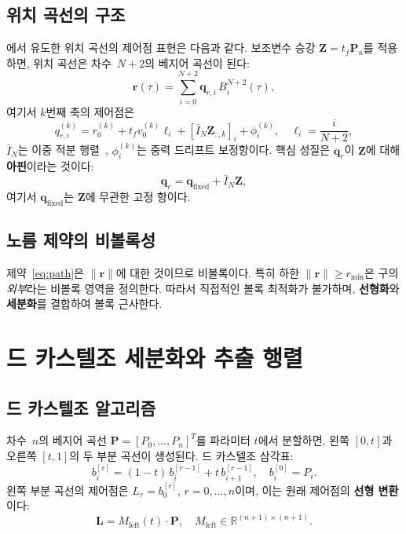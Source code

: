 \documentclass[11pt]{article}
\begin{document}
\subsection{위치 곡선의 구조}

\cite{report004,report007}에서 유도한 위치 곡선의 제어점 표현은 다음과 같다.
보조변수 승강 $\mathbf{Z} = t_f \mathbf{P}_u$를 적용하면,
위치 곡선은 차수~$N{+}2$의 베지어 곡선이 된다:
\begin{equation}\label{eq:pos_curve}
  \mathbf{r}(\tau) = \sum_{i=0}^{N+2} \mathbf{q}_{r,i}\, B_i^{N+2}(\tau),
\end{equation}
여기서 $k$번째 축의 제어점은
\begin{equation}\label{eq:qr}
  q_{r,i}^{(k)} = r_0^{(k)} + t_f v_0^{(k)} \ell_i
    + [\bar{I}_N \mathbf{Z}_{:,k}]_i
    + \phi_i^{(k)},
  \quad \ell_i = \frac{i}{N{+}2},
\end{equation}
$\bar{I}_N$는 이중 적분 행렬~\cite{report004},
$\phi_i^{(k)}$는 중력 드리프트 보정항이다.
핵심 성질은 $\mathbf{q}_r$이 $\mathbf{Z}$에 대해 \textbf{아핀}이라는 것이다:
\begin{equation}\label{eq:affine}
  \mathbf{q}_r = \mathbf{q}_{\mathrm{fixed}} + \bar{I}_N \mathbf{Z},
\end{equation}
여기서 $\mathbf{q}_{\mathrm{fixed}}$는 $\mathbf{Z}$에 무관한 고정 항이다.

\subsection{노름 제약의 비볼록성}

제약~\eqref{eq:path}은 $\|\mathbf{r}\|$에 대한 것이므로 비볼록이다.
특히 하한 $\|\mathbf{r}\| \ge r_{\min}$은
구의 \emph{외부}라는 비볼록 영역을 정의한다.
따라서 직접적인 볼록 최적화가 불가하며,
\textbf{선형화}와 \textbf{세분화}를 결합하여 볼록 근사한다.

\section{드 카스텔조 세분화와 추출 행렬}

\subsection{드 카스텔조 알고리즘}

차수~$n$의 베지어 곡선 $\mathbf{P} = [P_0, \ldots, P_n]^T$를
파라미터 $t$에서 분할하면, 왼쪽 $[0,t]$과 오른쪽 $[t,1]$의
두 부분 곡선이 생성된다. 드 카스텔조 삼각표:
\begin{equation}
  b_i^{[r]} = (1-t)\,b_i^{[r-1]} + t\,b_{i+1}^{[r-1]},
  \quad b_i^{[0]} = P_i.
\end{equation}
왼쪽 부분 곡선의 제어점은 $L_r = b_0^{[r]}$, $r=0,\ldots,n$이며,
이는 원래 제어점의 \textbf{선형 변환}이다:
\begin{equation}
  \mathbf{L} = M_{\mathrm{left}}(t) \cdot \mathbf{P},
  \quad M_{\mathrm{left}} \in \mathbb{R}^{(n+1)\times(n+1)}.
\end{equation}
\end{document}
